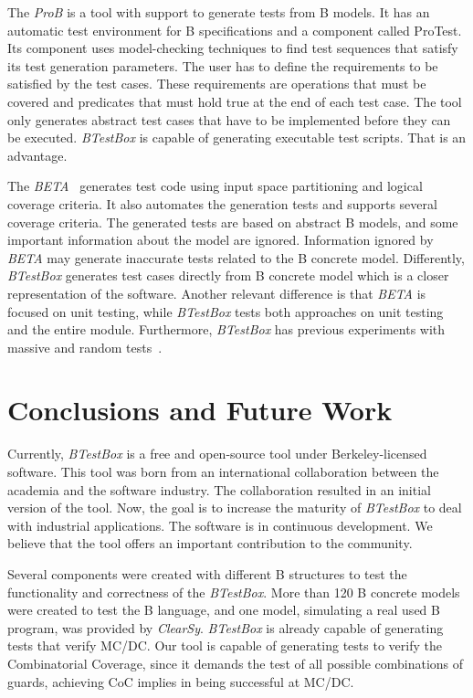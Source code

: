 \documentclass[runningheads]{llncs}
\begin{document}
The \textit{ProB} is a tool with support to generate tests from B models. It has an automatic test environment for B specifications and a component called ProTest.
Its component uses model-checking techniques to find test sequences that satisfy its test generation parameters. The user has to define the requirements to be satisfied by the test cases. These requirements are operations that must be covered and predicates that must hold true at the end of each test case. The tool only generates abstract test cases that have to be implemented before they can be executed. \textit{BTestBox} is capable of generating executable test scripts. That is an advantage. 


The \textit{BETA}~\cite{ernesto_thesis:2016} generates test code using input space partitioning and logical coverage criteria. It also automates the generation tests and supports several coverage criteria. The generated tests are based on abstract B models, and some important information about the model are ignored.
Information ignored by \textit{BETA} may generate inaccurate tests related to the B concrete model. Differently, \textit{BTestBox} generates test cases directly from B concrete model which is a closer representation of the software.
Another relevant difference is that \textit{BETA} is focused on unit testing, while \textit{BTestBox} tests both approaches on unit testing and the entire module. Furthermore, \textit{BTestBox} has previous experiments with massive and random tests~\cite{deharbebtestbox}.

\section{Conclusions and Future Work} \label{sec:Conclusion}


Currently, \textit{BTestBox} is a free and open-source tool under Berkeley-licensed software.
This tool was born from an international collaboration between the academia and the software industry. The collaboration resulted in an initial version of the tool. Now, the goal is to increase the maturity of \textit{BTestBox} to deal with industrial applications.
The software is in continuous development.
We believe that the tool offers an important contribution to the community.

Several components were created with different B structures to test the functionality and correctness of the \textit{BTestBox}. More than 120 B concrete models were created to test the B language, and one model, simulating a real used B program, was provided by \textit{ClearSy}. \textit{BTestBox} is already capable of generating tests that verify MC/DC. Our tool is capable of generating tests to verify the Combinatorial Coverage, since it demands the test of all possible combinations of guards, achieving CoC implies in being successful at MC/DC. %
\end{document}

